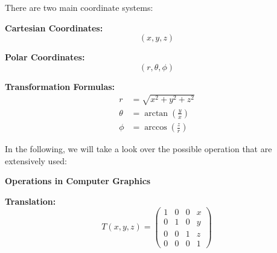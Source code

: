 There are two main coordinate systems:

\textbf{Cartesian Coordinates:}
\begin{equation}
    (x, y, z)
\end{equation}

\textbf{Polar Coordinates:}
\begin{equation}
    (r, \theta, \phi)
\end{equation}

\textbf{Transformation Formulas:}
\begin{align}
    r &= \sqrt{x^2 + y^2 + z^2} \\
    \theta &= \arctan\left(\frac{y}{x}\right) \\
    \phi &= \arccos\left(\frac{z}{r}\right)
\end{align}










\pagebreak

In the following, we will take a look over the possible operation that are extensively used:

\textbf{Operations in Computer Graphics}

\textbf{Translation:}
\begin{equation}
    T(x, y, z) = \begin{pmatrix}
    1 & 0 & 0 & x \\
    0 & 1 & 0 & y \\
    0 & 0 & 1 & z \\
    0 & 0 & 0 & 1
    \end{pmatrix}
\end{equation}

